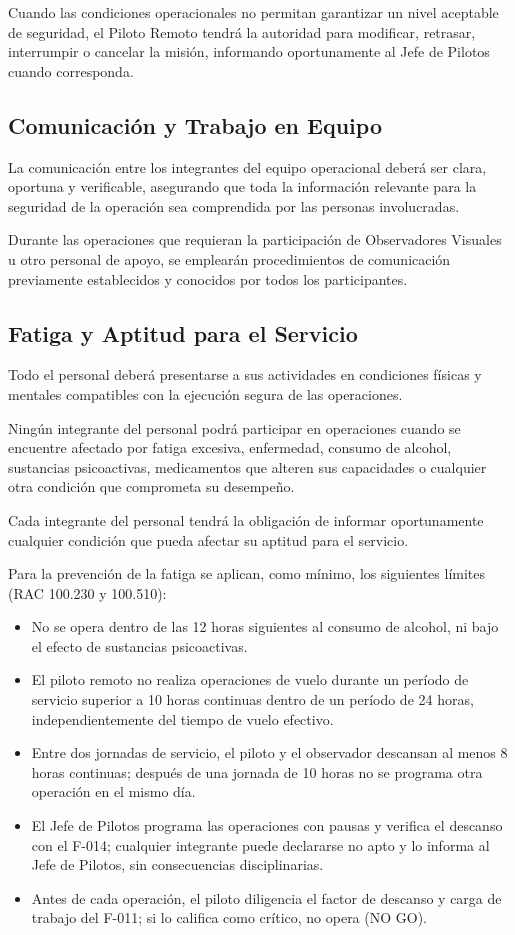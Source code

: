 Cuando las condiciones operacionales no permitan garantizar un nivel aceptable de seguridad, el Piloto Remoto tendrá la autoridad para modificar, retrasar, interrumpir o cancelar la misión, informando oportunamente al Jefe de Pilotos cuando corresponda.

\subsection{Comunicación y Trabajo en Equipo}

La comunicación entre los integrantes del equipo operacional deberá ser clara, oportuna y verificable, asegurando que toda la información relevante para la seguridad de la operación sea comprendida por las personas involucradas.

Durante las operaciones que requieran la participación de Observadores Visuales u otro personal de apoyo, se emplearán procedimientos de comunicación previamente establecidos y conocidos por todos los participantes.

\subsection{Fatiga y Aptitud para el Servicio}

Todo el personal deberá presentarse a sus actividades en condiciones físicas y mentales compatibles con la ejecución segura de las operaciones.

Ningún integrante del personal podrá participar en operaciones cuando se encuentre afectado por fatiga excesiva, enfermedad, consumo de alcohol, sustancias psicoactivas, medicamentos que alteren sus capacidades o cualquier otra condición que comprometa su desempeño.

Cada integrante del personal tendrá la obligación de informar oportunamente cualquier condición que pueda afectar su aptitud para el servicio.

Para la prevención de la fatiga se aplican, como mínimo, los siguientes límites (RAC 100.230 y 100.510):

\begin{itemize}
\item No se opera dentro de las 12 horas siguientes al consumo de alcohol, ni bajo el efecto de sustancias psicoactivas.
\item El piloto remoto no realiza operaciones de vuelo durante un período de servicio superior a 10 horas continuas dentro de un período de 24 horas, independientemente del tiempo de vuelo efectivo.
\item Entre dos jornadas de servicio, el piloto y el observador descansan al menos 8 horas continuas; después de una jornada de 10 horas no se programa otra operación en el mismo día.
\item El Jefe de Pilotos programa las operaciones con pausas y verifica el descanso con el F-014; cualquier integrante puede declararse no apto y lo informa al Jefe de Pilotos, sin consecuencias disciplinarias.
\item Antes de cada operación, el piloto diligencia el factor de descanso y carga de trabajo del F-011; si lo califica como crítico, no opera (NO GO).
\end{itemize}

